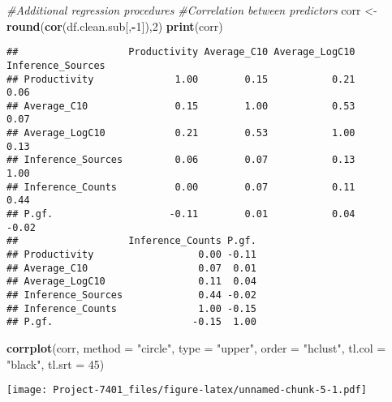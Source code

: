 \documentclass[
]{article}
\newenvironment{Shaded}{\begin{snugshade}}{\end{snugshade}}
\newcommand{\AttributeTok}[1]{\textcolor[rgb]{0.13,0.29,0.53}{#1}}
\newcommand{\CommentTok}[1]{\textcolor[rgb]{0.56,0.35,0.01}{\textit{#1}}}
\newcommand{\DecValTok}[1]{\textcolor[rgb]{0.00,0.00,0.81}{#1}}
\newcommand{\FunctionTok}[1]{\textcolor[rgb]{0.13,0.29,0.53}{\textbf{#1}}}
\newcommand{\NormalTok}[1]{#1}
\newcommand{\OtherTok}[1]{\textcolor[rgb]{0.56,0.35,0.01}{#1}}
\newcommand{\SpecialCharTok}[1]{\textcolor[rgb]{0.81,0.36,0.00}{\textbf{#1}}}
\newcommand{\StringTok}[1]{\textcolor[rgb]{0.31,0.60,0.02}{#1}}
\begin{document}
\begin{Shaded}
\begin{Highlighting}[]
\CommentTok{\#Additional regression procedures}
\CommentTok{\#Correlation between predictors}
\NormalTok{corr }\OtherTok{\textless{}{-}} \FunctionTok{round}\NormalTok{(}\FunctionTok{cor}\NormalTok{(df.clean.sub[,}\SpecialCharTok{{-}}\DecValTok{1}\NormalTok{]),}\DecValTok{2}\NormalTok{)}
\FunctionTok{print}\NormalTok{(corr)}
\end{Highlighting}
\end{Shaded}

\begin{verbatim}
##                   Productivity Average_C10 Average_LogC10 Inference_Sources
## Productivity              1.00        0.15           0.21              0.06
## Average_C10               0.15        1.00           0.53              0.07
## Average_LogC10            0.21        0.53           1.00              0.13
## Inference_Sources         0.06        0.07           0.13              1.00
## Inference_Counts          0.00        0.07           0.11              0.44
## P.gf.                    -0.11        0.01           0.04             -0.02
##                   Inference_Counts P.gf.
## Productivity                  0.00 -0.11
## Average_C10                   0.07  0.01
## Average_LogC10                0.11  0.04
## Inference_Sources             0.44 -0.02
## Inference_Counts              1.00 -0.15
## P.gf.                        -0.15  1.00
\end{verbatim}

\begin{Shaded}
\begin{Highlighting}[]
\FunctionTok{corrplot}\NormalTok{(corr, }\AttributeTok{method =} \StringTok{"circle"}\NormalTok{, }\AttributeTok{type =} \StringTok{"upper"}\NormalTok{, }\AttributeTok{order =} \StringTok{"hclust"}\NormalTok{, }\AttributeTok{tl.col =} \StringTok{"black"}\NormalTok{, }\AttributeTok{tl.srt =} \DecValTok{45}\NormalTok{)}
\end{Highlighting}
\end{Shaded}

\texttt{[image: Project-7401\_files/figure-latex/unnamed-chunk-5-1.pdf]}
\end{document}
